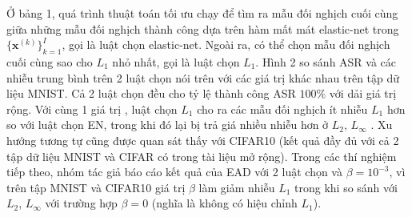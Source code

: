 Ở bảng 1, quá trình thuật toán tối ưu chạy để tìm ra mẫu đối nghịch cuối cùng giữa những mẫu đối nghịch thành công dựa trên hàm mất mát elastic-net trong $\{\mathbf{x}^{(k)}\}^I_{k=1}$, gọi là luật chọn elastic-net. Ngoài ra, có thể chọn mẫu đối nghịch cuối cùng sao cho $L_1$ nhỏ nhất, gọi là luật chọn $L_1$. Hình 2 so sánh ASR và các nhiễu trung bình trên 2 luật chọn nói trên với các giá trị  khác nhau trên tập dữ liệu MNIST. Cả 2 luật chọn đều cho tỷ lệ thành công ASR $100\%$ với dải giá trị  rộng. Với cùng 1 giá trị , luật chọn $L_1$ cho ra các mẫu đối nghịch ít nhiễu $L_1$ hơn so với luật chọn EN, trong khi đó lại bị trả giá nhiều nhiễu hơn ở $L_2$, $L_{\infty}$ . Xu hướng tương tự cũng được quan sát thấy với CIFAR10 (kết quả đầy đủ với cả 2 tập dữ liệu MNIST và CIFAR có trong tài liệu mở rộng). Trong các thí nghiệm tiếp theo, nhóm tác giả báo cáo kết quả của EAD với 2 luật chọn và $\beta = 10^{-3}$, vì trên tập MNIST và CIFAR10 giá trị $\beta$ làm giảm nhiễu $L_1$ trong khi so sánh với $L_2$, $L_{\infty}$ với trường hợp $\beta = 0$ (nghĩa là không có hiệu chỉnh $L_1$).

